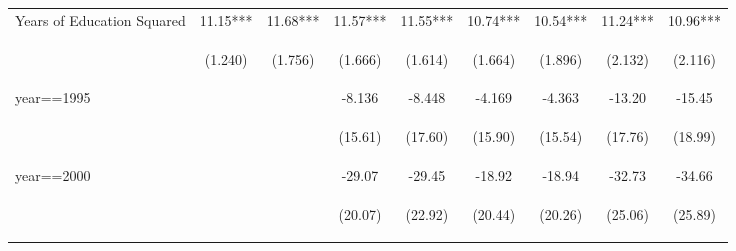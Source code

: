\begin{table}[htpb!]
\begin{center}
\begin{tabular}{lcccccccc}
Years of Education Squared&11.15***&11.68***&11.57***&11.55***&10.74***&10.54***&11.24***&10.96***\\
&\begin{footnotesize}(1.240)\end{footnotesize}&\begin{footnotesize}(1.756)\end{footnotesize}&\begin{footnotesize}(1.666)\end{footnotesize}&\begin{footnotesize}(1.614)\end{footnotesize}&\begin{footnotesize}(1.664)\end{footnotesize}&\begin{footnotesize}(1.896)\end{footnotesize}&\begin{footnotesize}(2.132)\end{footnotesize}&\begin{footnotesize}(2.116)\end{footnotesize}\\
year==1995&&&-8.136&-8.448&-4.169&-4.363&-13.20&-15.45\\
&&&\begin{footnotesize}(15.61)\end{footnotesize}&\begin{footnotesize}(17.60)\end{footnotesize}&\begin{footnotesize}(15.90)\end{footnotesize}&\begin{footnotesize}(15.54)\end{footnotesize}&\begin{footnotesize}(17.76)\end{footnotesize}&\begin{footnotesize}(18.99)\end{footnotesize}\\
year==2000&&&-29.07&-29.45&-18.92&-18.94&-32.73&-34.66\\
&&&\begin{footnotesize}(20.07)\end{footnotesize}&\begin{footnotesize}(22.92)\end{footnotesize}&\begin{footnotesize}(20.44)\end{footnotesize}&\begin{footnotesize}(20.26)\end{footnotesize}&\begin{footnotesize}(25.06)\end{footnotesize}&\begin{footnotesize}(25.89)\end{footnotesize}\\

\end{tabular}
\end{center}
\end{table}
